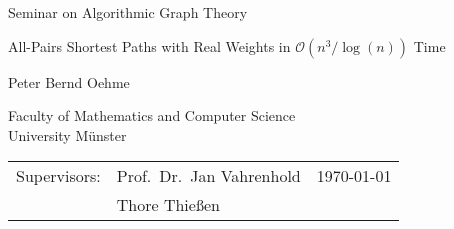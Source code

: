 

\usepackage[a4paper, margin=4cm, left=3cm, right=3cm]{geometry}



    \begin{titlepage}
        \setlength{\parindent}{0pt}

        \begin{center}
            \vspace*{12em}

            Seminar on Algorithmic Graph Theory

            \vspace*{3em}

            {\Huge{All-Pairs Shortest Paths with Real Weights in $\mathcal{O} \left( n^3 / \log(n) \right)$ Time}\par}

            \vspace*{\fill}

            {\Large{Peter Bernd Oehme}}

            \vspace*{3em}

            Faculty of Mathematics and Computer Science \\
            University Münster

            \vspace*{2em}

            
        \end{center}

        \vspace*{8em}

        \begin{tabularx}{\textwidth}{l l >{\raggedleft\arraybackslash}X}
            Supervisors: & Prof.\ Dr.\ Jan Vahrenhold     & \today \\
                         & Thore Thießen & \\
        \end{tabularx}
    \end{titlepage}
